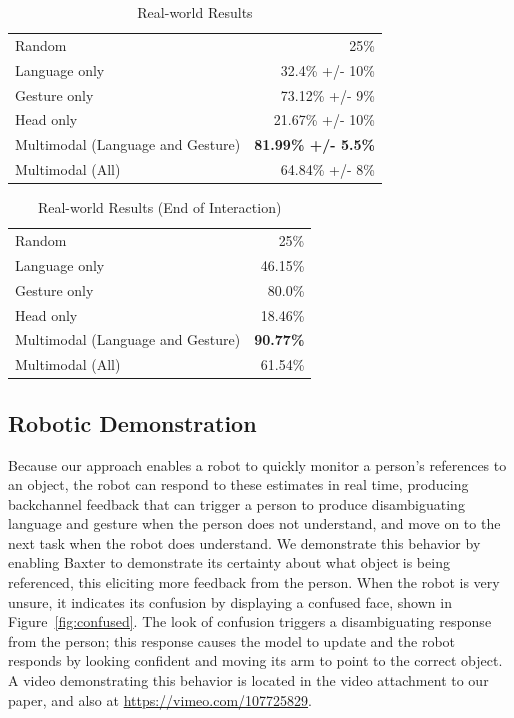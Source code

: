 \documentclass[letterpaper, 10 pt, conference]{ieeeconf}
\begin{document}
\begin{table}
\caption{Real-world Results\label{table:real_results}}
\centering
\begin{tabular}{lr}
\toprule
Random & 25\%\\
Language only &  32.4\% +/- 10\%\\
Gesture only  &  73.12\% +/- 9\%\\
Head only     &  21.67\% +/- 10\%\\
Multimodal (Language and Gesture) & {\bf 81.99\% +/- 5.5\%}\\
Multimodal (All) &  64.84\% +/- 8\%\\
\bottomrule
\end{tabular}
\end{table}
\begin{table}
\caption{Real-world Results (End of Interaction)\label{table:end_real}}
\centering
\begin{tabular}{lr}
\toprule
Random & 25\%\\
Language only &  46.15\%\\
Gesture only  &  80.0\%\\
Head only     & 18.46\%\\
Multimodal (Language and Gesture) & {\bf 90.77\%}\\
Multimodal (All) &  61.54\%\\
\bottomrule
\end{tabular}
\end{table}

\subsection{Robotic Demonstration}

Because our approach enables a robot to quickly monitor a person's
references to an object, the robot can respond to these estimates in
real time, producing backchannel feedback that can trigger a person to
produce disambiguating language and gesture when the person does not
understand, and move on to the next task when the robot does
understand.  We demonstrate this behavior by enabling Baxter to
demonstrate its certainty about what object is being referenced, this
eliciting more feedback from the person.  When the robot is very
unsure, it indicates its confusion by displaying a confused face,
shown in Figure~\ref{fig:confused}.  The look of confusion triggers a
disambiguating response from the person; this response causes the
model to update and the robot responds by looking confident and moving
its arm to point to the correct object.  A video demonstrating this
behavior is located in the video attachment to our paper, and also at
\url{https://vimeo.com/107725829}.
\end{document}
